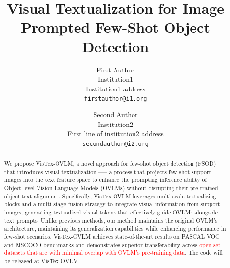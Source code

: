 \documentclass[10pt,twocolumn,letterpaper]{article}
\title{Visual Textualization for Image Prompted Few-Shot Object Detection}
\author{First Author\\
Institution1\\
Institution1 address\\
{\tt\small firstauthor@i1.org}
\and
Second Author\\
Institution2\\
First line of institution2 address\\
{\tt\small secondauthor@i2.org}
}
\begin{document}
\maketitle
%     
% 
% 
% 

\begin{abstract}
We propose VisTex-OVLM, a novel approach for few-shot object detection (FSOD) that introduces visual textualization —-- a process that projects few-shot support images into the text feature space to enhance the prompting inference ability of Object-level Vision-Language Models (OVLMs) without disrupting their pre-trained object-text alignment. Specifically, VisTex-OVLM leverages multi-scale textualizing blocks and a multi-stage fusion strategy to integrate visual information from support images, generating textualized visual tokens that effectively guide OVLMs alongside text prompts. Unlike previous methods, our method maintains the original OVLM's architecture, maintaining its generalization capabilities while enhancing performance in few-shot scenarios. VisTex-OVLM achieves state-of-the-art results on PASCAL VOC and MSCOCO benchmarks and demonstrates superior transferability across \textcolor{red}{open-set datasets that are with minimal overlap with OVLM's pre-training data}. The code will be released at \href{https://github.com/WitGotFlg/VisTex-OVLM}{VisTex-OVLM}.
\end{abstract}

\end{document}
